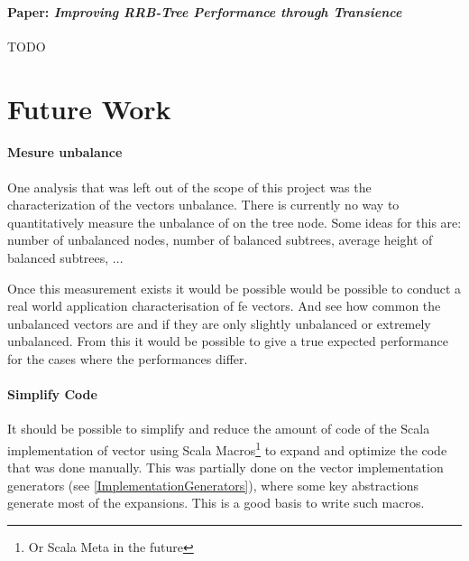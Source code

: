 \paragraph{Paper: \emph{Improving RRB-Tree Performance through Transience}}



\color{red} TODO \color{black}



\section{Future Work}

\paragraph{Mesure unbalance}
One analysis that was left out of the scope of this project was the characterization of the vectors unbalance. There is currently no way to quantitatively measure the unbalance of on the tree node. Some ideas for this are: number of unbalanced nodes, number of balanced subtrees, average height of balanced subtrees, ... 

Once this measurement exists it would be possible would be possible to conduct a real world application characterisation of fe vectors. And see how common the unbalanced vectors are and if they are only slightly unbalanced or extremely unbalanced. From this it would be possible to give a true expected performance for the cases where the performances differ.

\paragraph{Simplify Code}
It should be possible to simplify and reduce the amount of code of the Scala implementation of vector using Scala Macros\footnote{Or Scala Meta in the future} to expand and optimize the code that was done manually. This was partially done on the vector implementation generators (see \ref{ImplementationGenerators}), where some key abstractions generate most of the expansions. This is a good basis to write such macros.

